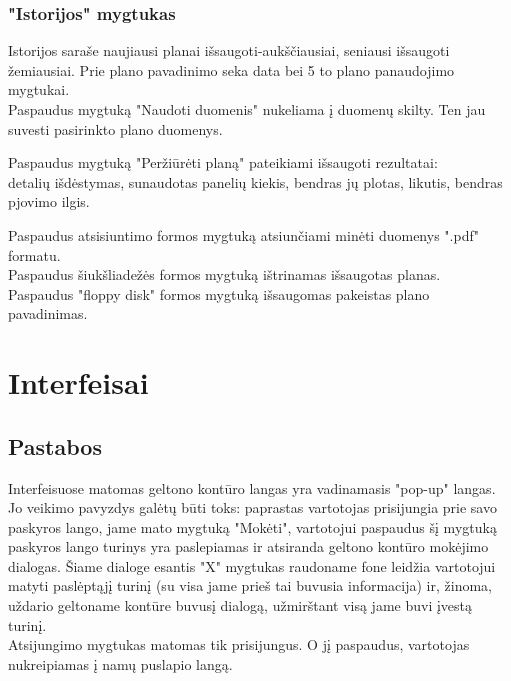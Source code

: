\documentclass[a4paper,12pt]{article}
\begin{document}
\subsubsection{"Istorijos" mygtukas}
Istorijos saraše naujiausi planai išsaugoti-aukščiausiai, seniausi išsaugoti žemiausiai.
Prie plano pavadinimo seka data bei 5 to plano panaudojimo mygtukai.\\
Paspaudus mygtuką "Naudoti duomenis" nukeliama į duomenų skilty.
Ten jau suvesti pasirinkto plano duomenys.

Paspaudus mygtuką "Peržiūrėti planą" pateikiami išsaugoti rezultatai:\\
detalių išdėstymas, sunaudotas panelių kiekis, bendras jų plotas, likutis, bendras pjovimo ilgis.

Paspaudus atsisiuntimo formos mygtuką atsiunčiami minėti duomenys ".pdf" formatu.\\
Paspaudus šiukšliadežės formos mygtuką ištrinamas išsaugotas planas.\\
Paspaudus "floppy disk" formos mygtuką išsaugomas pakeistas plano pavadinimas.

\clearpage

\section{Interfeisai}

\subsection{Pastabos}
Interfeisuose matomas geltono kontūro langas yra vadinamasis "pop-up" langas. Jo veikimo pavyzdys galėtų būti toks: paprastas vartotojas prisijungia prie savo paskyros lango, jame mato mygtuką "Mokėti", vartotojui paspaudus šį mygtuką paskyros lango turinys yra paslepiamas ir atsiranda geltono kontūro mokėjimo dialogas. Šiame dialoge esantis "X" mygtukas raudoname fone leidžia vartotojui matyti paslėptąjį turinį (su visa jame prieš tai buvusia informacija) ir, žinoma, uždario geltoname kontūre buvusį dialogą, užmirštant visą jame buvi įvestą turinį.\\
Atsijungimo mygtukas matomas tik prisijungus. O jį paspaudus, vartotojas nukreipiamas į namų puslapio langą.
\end{document}

